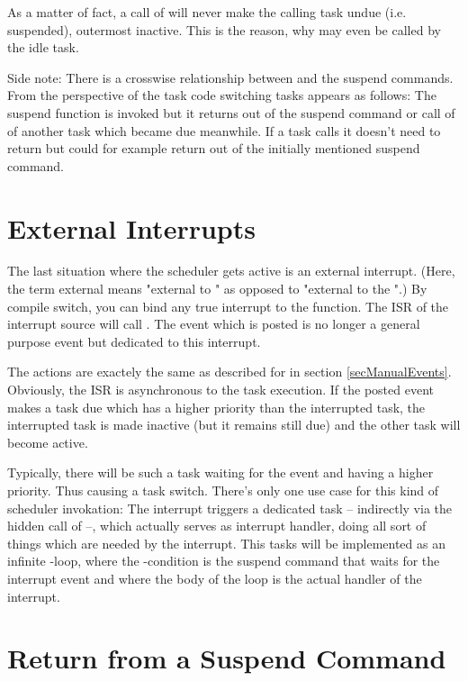 As a matter of fact, a call of  will never make the
calling task undue (i.e. suspended), outermost inactive. This is the
reason, why  may even be called by the idle task.

Side note: There is a crosswise relationship between  and
the suspend commands. From the perspective of the task code switching
tasks appears as follows: The suspend function is invoked but it returns
out of the suspend command or call of  of another task
which became due meanwhile. If a task calls  it doesn't
need to return but could for example return out of the initially mentioned
suspend command.


\section{External Interrupts}
\label{secInterruptEvents}

The last situation where the scheduler gets active is an external
interrupt. (Here, the term external means "external to \rtos{}" as opposed
to "external to the \uC{}".) By compile switch, you can bind any true
interrupt to the  function. The ISR of the interrupt
source will call . The event which is posted is no longer
a general purpose event but dedicated to this interrupt. 

The actions are exactely the same as described for  in
section \ref{secManualEvents}. Obviously, the ISR is asynchronous to the
task execution. If the posted event makes a task due which has a higher
priority than the interrupted task, the interrupted task is made inactive
(but it remains still due) and the other task will become active.

Typically, there will be such a task waiting for the event and having a
higher priority. Thus causing a task switch. There's only one use case for
this kind of scheduler invokation: The interrupt triggers a dedicated task
-- indirectly via the hidden call of  --, which actually
serves as interrupt handler, doing all sort of things which are needed by
the interrupt. This tasks will be implemented as an infinite
-loop, where the -condition is the suspend
command that waits for the interrupt event and where the body of the loop
is the actual handler of the interrupt.


\section{Return from a Suspend Command}
\label{secReturnFromSuspend}

